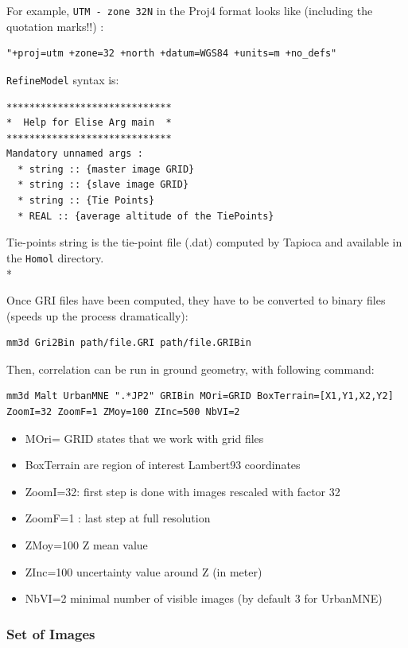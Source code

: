 For example, {\tt UTM - zone 32N} in the Proj4 format looks like (including the quotation marks!!) :
\begin{verbatim}
"+proj=utm +zone=32 +north +datum=WGS84 +units=m +no_defs"
 \end{verbatim}
{\tt RefineModel} syntax is:

\begin{verbatim}
*****************************
*  Help for Elise Arg main  *
*****************************
Mandatory unnamed args :
  * string :: {master image GRID}
  * string :: {slave image GRID}
  * string :: {Tie Points}
  * REAL :: {average altitude of the TiePoints}
\end{verbatim}

Tie-points string is the tie-point file (.dat) computed by Tapioca and available in the {\tt Homol} directory.\\*

Once GRI files have been computed, they have to be converted to binary files (speeds up the process dramatically):
\begin{verbatim}
mm3d Gri2Bin path/file.GRI path/file.GRIBin
\end{verbatim}

Then, correlation can be run in ground geometry, with following command:

\begin{verbatim}
mm3d Malt UrbanMNE ".*JP2" GRIBin MOri=GRID BoxTerrain=[X1,Y1,X2,Y2]
ZoomI=32 ZoomF=1 ZMoy=100 ZInc=500 NbVI=2
\end{verbatim}

\begin{itemize}
 \item MOri= GRID states that we work with grid files
 \item   BoxTerrain are region of interest Lambert93 coordinates
 \item   ZoomI=32: first step is done with images rescaled with factor 32
 \item   ZoomF=1 : last step at full resolution
 \item   ZMoy=100  Z mean value
 \item   ZInc=100 uncertainty value around Z (in meter)
 \item   NbVI=2 minimal number of visible images  (by default 3 for UrbanMNE)
\end{itemize}

\subsubsection{Set of Images}

